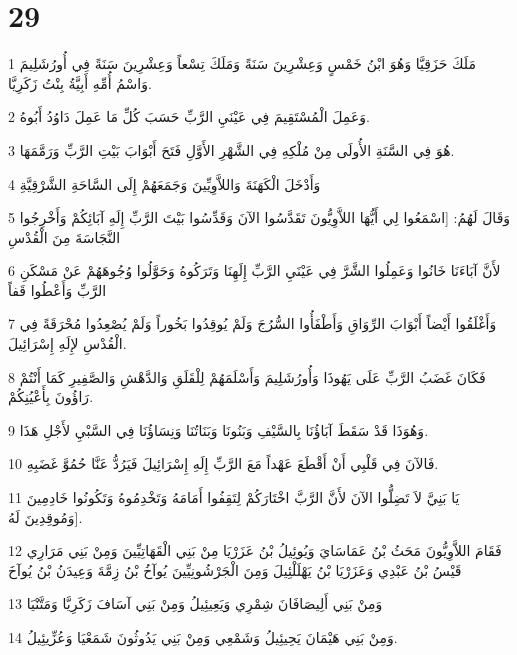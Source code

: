 \chapter{29}

\par 1 مَلَكَ حَزَقِيَّا وَهُوَ ابْنُ خَمْسٍ وَعِشْرِينَ سَنَةً وَمَلَكَ تِسْعاً وَعِشْرِينَ سَنَةً فِي أُورُشَلِيمَ وَاسْمُ أُمِّهِ أَبِيَّةُ بِنْتُ زَكَرِيَّا.
\par 2 وَعَمِلَ الْمُسْتَقِيمَ فِي عَيْنَيِ الرَّبِّ حَسَبَ كُلِّ مَا عَمِلَ دَاوُدُ أَبُوهُ.
\par 3 هُوَ فِي السَّنَةِ الأُولَى مِنْ مُلْكِهِ فِي الشَّهْرِ الأَوَّلِ فَتَحَ أَبْوَابَ بَيْتِ الرَّبِّ وَرَمَّمَهَا.
\par 4 وَأَدْخَلَ الْكَهَنَةَ وَاللاَّوِيِّينَ وَجَمَعَهُمْ إِلَى السَّاحَةِ الشَّرْقِيَّةِ
\par 5 وَقَالَ لَهُمُ: [اسْمَعُوا لِي أَيُّهَا اللاَّوِيُّونَ تَقَدَّسُوا الآنَ وَقَدِّسُوا بَيْتَ الرَّبِّ إِلَهِ آبَائِكُمْ وَأَخْرِجُوا النَّجَاسَةَ مِنَ الْقُدْسِ
\par 6 لأَنَّ آبَاءَنَا خَانُوا وَعَمِلُوا الشَّرَّ فِي عَيْنَيِ الرَّبِّ إِلَهِنَا وَتَرَكُوهُ وَحَوَّلُوا وُجُوهَهُمْ عَنْ مَسْكَنِ الرَّبِّ وَأَعْطُوا قَفاً
\par 7 وَأَغْلَقُوا أَيْضاً أَبْوَابَ الرِّوَاقِ وَأَطْفَأُوا السُّرُجَ وَلَمْ يُوقِدُوا بَخُوراً وَلَمْ يُصْعِدُوا مُحْرَقَةً فِي الْقُدْسِ لإِلَهِ إِسْرَائِيلَ.
\par 8 فَكَانَ غَضَبُ الرَّبِّ عَلَى يَهُوذَا وَأُورُشَلِيمَ وَأَسْلَمَهُمْ لِلْقَلَقِ وَالدَّهْشِ وَالصَّفِيرِ كَمَا أَنْتُمْ رَاؤُونَ بِأَعْيُنِكُمْ.
\par 9 وَهُوَذَا قَدْ سَقَطَ آبَاؤُنَا بِالسَّيْفِ وَبَنُونَا وَبَنَاتُنَا وَنِسَاؤُنَا فِي السَّبْيِ لأَجْلِ هَذَا.
\par 10 فَالآنَ فِي قَلْبِي أَنْ أَقْطَعَ عَهْداً مَعَ الرَّبِّ إِلَهِ إِسْرَائِيلَ فَيَرُدُّ عَنَّا حُمُوَّ غَضَبِهِ.
\par 11 يَا بَنِيَّ لاَ تَضِلُّوا الآنَ لأَنَّ الرَّبَّ اخْتَارَكُمْ لِتَقِفُوا أَمَامَهُ وَتَخْدِمُوهُ وَتَكُونُوا خَادِمِينَ وَمُوقِدِينَ لَهُ].
\par 12 فَقَامَ اللاَّوِيُّونَ مَحَثُ بْنُ عَمَاسَايَ وَيُوئِيلُ بْنُ عَزَرْيَا مِنْ بَنِي الْقَهَاتِيِّينَ وَمِنْ بَنِي مَرَارِي قَيْسُ بْنُ عَبْدِي وَعَزَرْيَا بْنُ يَهْلَلْئِيلَ وَمِنَ الْجَرْشُونِيِّينَ يُوآخُ بْنُ زِمَّةَ وَعِيدَنُ بْنُ يُوآخَ
\par 13 وَمِنْ بَنِي أَلِيصَافَانَ شِمْرِي وَيَعِيئِيلُ وَمِنْ بَنِي آسَافَ زَكَرِيَّا وَمَتَّنْيَا
\par 14 وَمِنْ بَنِي هَيْمَانَ يَحِيئِيلُ وَشَمْعِي وَمِنْ بَنِي يَدُوثُونَ شَمَعْيَا وَعُزِّيئِيلُ.
